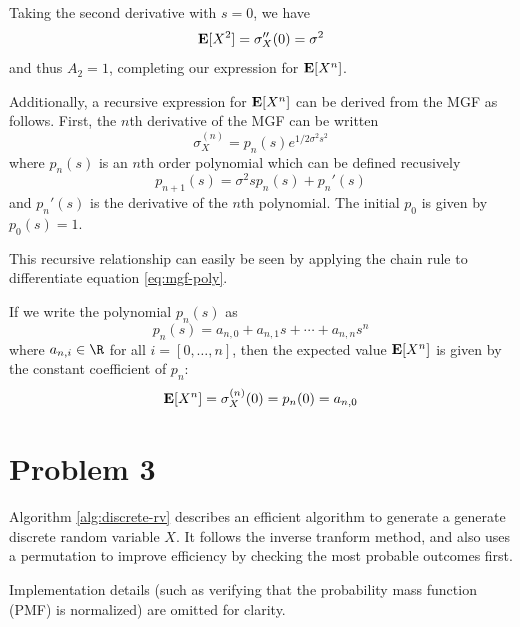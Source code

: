 \documentclass{homework}
\begin{document}
Taking the second derivative with $s=0$, we have
\begin{equation*}
    {\bf E}[X^2] = \sigma_X''(0) = \sigma^2  
\end{equation*}
and thus $A_2=1$, completing our expression for ${\bf E}[X^n]$.

Additionally, a recursive expression for ${\bf E}[X^n]$ can be derived from
the MGF as follows. First, the $n$th derivative of the MGF can be written
\begin{equation}
    \sigma_X^{(n)} = p_n(s) e^{1/2 \sigma^2 s^2}
    \label{eq:mgf-poly}
\end{equation}
where $p_n(s)$ is an $n$th order polynomial which can be defined
recusively
\begin{equation*}
    p_{n+1}(s) = \sigma^2 s p_n(s) + p_n'(s)
\end{equation*}
and $p_n'(s)$ is the derivative of the $n$th polynomial. The initial
$p_0$ is given by $p_0(s) = 1$.

This recursive relationship can easily be seen by applying the chain
rule to differentiate equation \ref{eq:mgf-poly}.

If we write the polynomial $p_n(s)$ as
\begin{equation*}
    p_n(s) = a_{n,0} + a_{n,1} s + \cdots + a_{n,n} s^n
\end{equation*}
where $a_{n,i}\in\R$ for all $i=[0,\dots,n]$, then the expected value 
${\bf E}[X^n]$ is given by the constant coefficient of $p_n$:
\begin{equation*}
    {\bf E}[X^n] = \sigma_X^{(n)}(0) = p_n(0) = a_{n,0}
\end{equation*}


\section{Problem 3}
Algorithm \ref{alg:discrete-rv} describes an efficient algorithm to generate a
generate discrete random variable $X$. It follows the inverse tranform method,
and also uses a permutation to improve
efficiency by checking the most probable outcomes first.

Implementation details (such as verifying that the probability mass function (PMF)
is normalized) are omitted for clarity.
\end{document}
